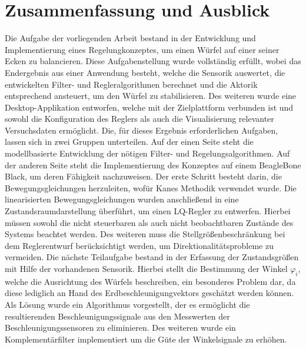 \chapter{Zusammenfassung und Ausblick}
Die Aufgabe der vorliegenden Arbeit bestand in der Entwicklung und Implementierung eines Regelungkonzeptes, um einen Würfel auf einer seiner Ecken zu balancieren. Diese Aufgabenstellung wurde vollständig erfüllt, wobei das Endergebnis aus einer Anwendung besteht, welche die Sensorik auswertet, die entwickelten Filter- und Regleralgorithmen berechnet und die Aktorik entsprechend ansteuert, um den Würfel zu stabilisieren. Des weiteren wurde eine Desktop-Applikation entworfen, welche mit der Zielplattform verbunden ist und sowohl die Konfiguration des Reglers als auch die Visualisierung relevanter Versuchsdaten ermöglicht. Die, für dieses Ergebnis erforderlichen Aufgaben, lassen sich in zwei Gruppen unterteilen. Auf der einen Seite steht die modellbasierte Entwicklung der nötigen Filter- und Regelungsalgorithmen. Auf der anderen Seite steht die Implementierung des Konzeptes auf einem BeagleBone Black, um deren Fähigkeit nachzuweisen.
Der erste Schritt besteht darin, die Bewegungsgleichungen herzuleiten, wofür Kanes Methodik verwendet wurde. Die linearisierten Bewegungsgleichungen wurden anschließend in eine Zustandsraumdarstellung überführt, um einen LQ-Regler zu entwerfen. Hierbei müssen sowohl die nicht steuerbaren als auch nicht beobachtbaren Zustände des Systems beachtet werden. Des weiteren muss die Stellgrößenbeschränkung bei dem Reglerentwurf berücksichtigt werden, um Direktionalitätsprobleme zu vermeiden.
Die nächste Teilaufgabe bestand in der Erfassung der Zustandsgrößen mit Hilfe der vorhandenen Sensorik. Hierbei stellt die Bestimmung der Winkel $\varphi_i$, welche die Ausrichtung des Würfels beschreiben, ein besonderes Problem dar, da diese lediglich an Hand des Erdbeschleunigungvektors geschätzt werden können. Als Lösung wurde ein Algorithmus vorgestellt, der es ermöglicht die resultierenden Beschleunigungssignale aus den Messwerten der Beschleunigungssensoren zu eliminieren. Des weiteren wurde ein Komplementärfilter implementiert um die Güte der Winkelsignale zu erhöhen.

